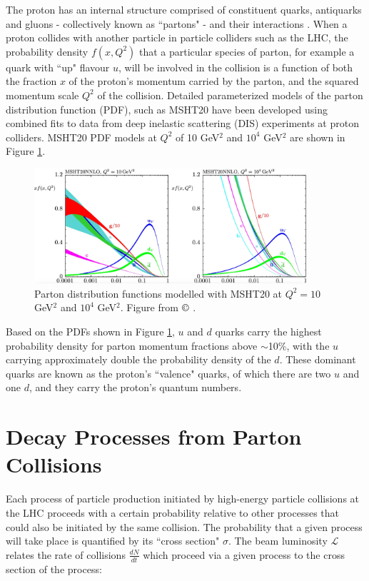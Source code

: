 The proton has an internal structure comprised of constituent quarks, antiquarks and gluons - collectively known as ``partons" - and their interactions \cite{parton_model}. When a proton collides with another particle in particle colliders such as the LHC, the probability density \(f(x, Q^2)\) that a particular species of parton, for example a quark with ``up" flavour \(u\), will be involved in the collision is a function of both the fraction \(x\) of the proton's momentum carried by the parton, and the squared momentum scale \(Q^2\) of the collision. Detailed parameterized models of the parton distribution function (PDF), such as MSHT20 \cite{MSHT20} have been developed using combined fits to data from deep inelastic scattering (DIS) experiments at proton colliders. MSHT20 PDF models at \(Q^2\) of 10 GeV\(^2\) and \(10^4\) GeV\(^2\) are shown in Figure \ref{fig:msht20_pdfs}.

\begin{figure}[H]
	\centering
	\includegraphics[width=0.9\textwidth]{Figures/3/MSHT20_PDFs.pdf}
	\caption[]{Parton distribution functions modelled with MSHT20 at \(Q^2=10\) GeV\(^2\) and \(10^4\) GeV\(^2\). Figure from \(\copyright\) \cite{MSHT20}.}
	\label{fig:msht20_pdfs}
\end{figure}

Based on the PDFs shown in Figure \ref{fig:msht20_pdfs}, \(u\) and \(d\) quarks carry the highest probability density for parton momentum fractions above \(\sim\)10\%, with the \(u\) carrying approximately double the probability density of the \(d\). These dominant quarks are known as the proton's ``valence" quarks, of which there are two \(u\) and one \(d\), and they carry the proton's quantum numbers.

\section{Decay Processes from Parton Collisions}
\label{sec:decay_processes}

Each process of particle production initiated by high-energy particle collisions at the LHC proceeds with a certain probability relative to other processes that could also be initiated by the same collision. The probability that a given process will take place is quantified by its ``cross section" \(\sigma\). The beam luminosity \(\mathcal{L}\) relates the rate of collisions \(\frac{dN}{dt}\) which proceed via a given process to the cross section of the process:

